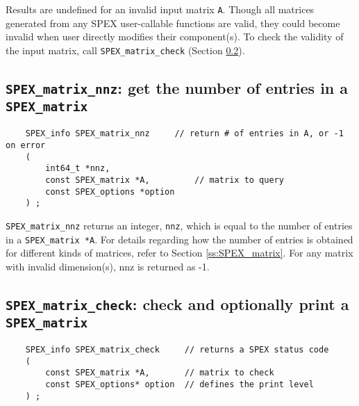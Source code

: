 \documentclass[12pt,oneside]{book}
\theoremstyle{definition}
\begin{document}
Results are undefined for an invalid input matrix \verb|A|. Though all matrices generated from any SPEX user-callable functions are valid, they could become invalid when user directly modifies their component(s). To check the validity of the input matrix, call
\verb|SPEX_matrix_check| (Section \ref{s:user:matrix_check}).


\subsection{\texttt{SPEX\_matrix\_nnz}: get the number of entries in a \texttt{SPEX\_matrix}}
\label{s:user:matrix_nnz}
\begin{mdframed}[userdefinedwidth=\textwidth]
{\footnotesize
\begin{verbatim}
    SPEX_info SPEX_matrix_nnz     // return # of entries in A, or -1 on error
    (
        int64_t *nnz,
        const SPEX_matrix *A,         // matrix to query
        const SPEX_options *option
    ) ;
\end{verbatim}
} \end{mdframed}

\verb|SPEX_matrix_nnz| returns an integer, \verb|nnz|, which is equal to the number of entries in a \verb|SPEX_matrix *A|.
For details regarding how the number of entries is obtained for different kinds
of matrices, refer to Section \ref{ss:SPEX_matrix}.
For any matrix with invalid dimension(s), nnz is returned as -1.


\subsection{\texttt{SPEX\_matrix\_check}: check and optionally print a \texttt{SPEX\_matrix}} \label{s:user:matrix_check}
\begin{mdframed}[userdefinedwidth=\textwidth]
{\footnotesize
\begin{verbatim}
    SPEX_info SPEX_matrix_check     // returns a SPEX status code
    (
        const SPEX_matrix *A,       // matrix to check
        const SPEX_options* option  // defines the print level
    ) ;
\end{verbatim}
} \end{mdframed}
\end{document}
